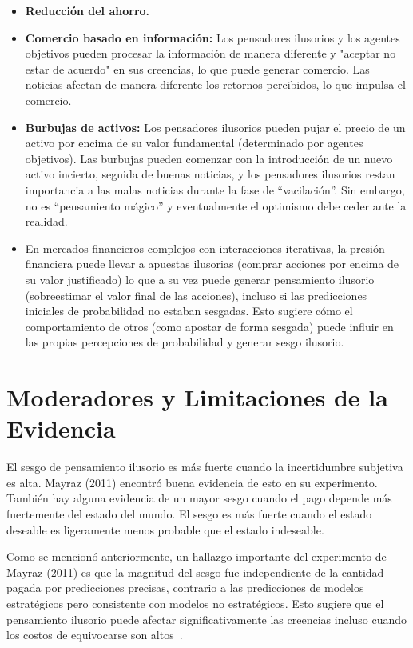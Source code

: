 \documentclass[12pt, a4paper, twoside]{article}
\begin{document}
\begin{itemize}
    \item \textbf{Reducción del ahorro.}
    \item \textbf{Comercio basado en información:} Los pensadores ilusorios y los agentes objetivos pueden procesar la información de manera diferente y "aceptar no estar de acuerdo" en sus creencias, lo que puede generar comercio. Las noticias afectan de manera diferente los retornos percibidos, lo que impulsa el comercio.
    \item \textbf{Burbujas de activos:} Los pensadores ilusorios pueden pujar el precio de un activo por encima de su valor fundamental (determinado por agentes objetivos). Las burbujas pueden comenzar con la introducción de un nuevo activo incierto, seguida de buenas noticias, y los pensadores ilusorios restan importancia a las malas noticias durante la fase de ``vacilación''. Sin embargo, no es ``pensamiento mágico'' y eventualmente el optimismo debe ceder ante la realidad.
    \item En mercados financieros complejos con interacciones iterativas, la presión financiera puede llevar a apuestas ilusorias (comprar acciones por encima de su valor justificado) lo que a su vez puede generar pensamiento ilusorio (sobreestimar el valor final de las acciones), incluso si las predicciones iniciales de probabilidad no estaban sesgadas. Esto sugiere cómo el comportamiento de otros (como apostar de forma sesgada) puede influir en las propias percepciones de probabilidad y generar sesgo ilusorio.
\end{itemize}

\section{Moderadores y Limitaciones de la Evidencia}

El sesgo de pensamiento ilusorio es más fuerte cuando la incertidumbre subjetiva es alta. Mayraz (2011) encontró buena evidencia de esto en su experimento. 
También hay alguna evidencia de un mayor sesgo cuando el pago depende más fuertemente del estado del mundo. El sesgo es más fuerte cuando el estado deseable 
es ligeramente menos probable que el estado indeseable.

Como se mencionó anteriormente, un hallazgo importante del experimento de Mayraz (2011) es que la magnitud del sesgo fue independiente de la cantidad pagada 
por predicciones precisas, contrario a las predicciones de modelos estratégicos pero consistente con modelos no estratégicos. Esto sugiere que el pensamiento 
ilusorio puede afectar significativamente las creencias incluso cuando los costos de equivocarse son altos~\cite{mayraz2011wishful}.
\end{document}
